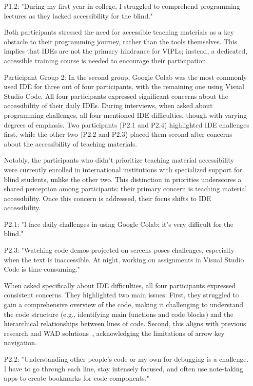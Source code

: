 P1.2: "During my first year in college, I struggled to comprehend programming lectures as they lacked accessibility for the blind."

Both participants stressed the need for accessible teaching materials as a key obstacle to their programming journey, rather than the tools themselves. This implies that IDEs are not the primary hindrance for VIPLs; instead, a dedicated, accessible training course is needed to encourage their participation.

Participant Group 2: In the second group, Google Colab was the most commonly used IDE for three out of four participants, with the remaining one using Visual Studio Code. All four participants expressed significant concerns about the accessibility of their daily IDEs. During interviews, when asked about programming challenges, all four mentioned IDE difficulties, though with varying degrees of emphasis. Two participants (P2.1 and P2.4) highlighted IDE challenges first, while the other two (P2.2 and P2.3) placed them second after concerns about the accessibility of teaching materials.

Notably, the participants who didn't prioritize teaching material accessibility were currently enrolled in international institutions with specialized support for blind students, unlike the other two. This distinction in priorities underscores a shared perception among participants: their primary concern is teaching material accessibility. Once this concern is addressed, their focus shifts to IDE accessibility.

P2.1: "I face daily challenges in using Google Colab; it's very difficult for the blind."

P2.3: "Watching code demos projected on screens poses challenges, especially when the text is inaccessible. At night, working on assignments in Visual Studio Code is time-consuming."

When asked specifically about IDE difficulties, all four participants
expressed consistent concerns. They highlighted two main issues:
First, they struggled to gain a comprehensive overview of the code,
making it challenging to understand the code structure (e.g.,
identifying main functions and code blocks) and the hierarchical
relationships between lines of code. Second, this aligns with previous
research and WAD solutions~\cite{wad07}, acknowledging the limitations
of arrow key navigation.

P2.2: "Understanding other people's code or my own for debugging is a challenge. I have to go through each line, stay intensely focused, and often use note-taking apps to create bookmarks for code components."


